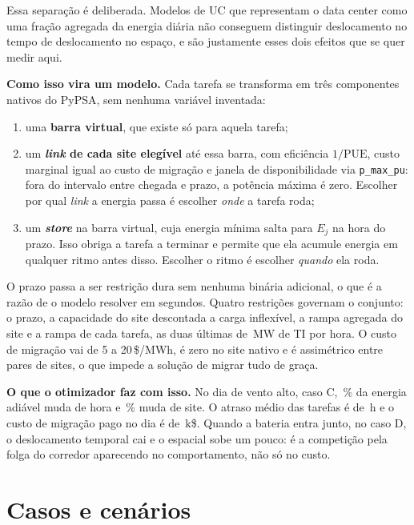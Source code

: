 \documentclass[11pt,a4paper]{article}
\begin{document}
Essa separação é deliberada. Modelos de UC que representam o data center como uma fração agregada da
energia diária não conseguem distinguir deslocamento no tempo de deslocamento no espaço, e são justamente
esses dois efeitos que se quer medir aqui.

\textbf{Como isso vira um modelo.} Cada tarefa se transforma em três componentes nativos do PyPSA, sem
nenhuma variável inventada:

\begin{enumerate}
\item uma \textbf{barra virtual}, que existe só para aquela tarefa;
\item um \textbf{\emph{link} de cada site elegível} até essa barra, com eficiência $1/\mathrm{PUE}$, custo
marginal igual ao custo de migração e janela de disponibilidade via \texttt{p\_max\_pu}: fora do intervalo
entre chegada e prazo, a potência máxima é zero. Escolher por qual \emph{link} a energia passa é escolher
\emph{onde} a tarefa roda;
\item um \textbf{\emph{store}} na barra virtual, cuja energia mínima salta para $E_j$ na hora do prazo.
Isso obriga a tarefa a terminar e permite que ela acumule energia em qualquer ritmo antes disso. Escolher
o ritmo é escolher \emph{quando} ela roda.
\end{enumerate}

O prazo passa a ser restrição dura sem nenhuma binária adicional, o que é a razão de o modelo resolver em
segundos. Quatro restrições governam o conjunto: o prazo, a capacidade do site descontada a carga
inflexível, a rampa agregada do site e a rampa de cada tarefa, as duas últimas de \numdcrampa{}\,MW de TI
por hora. O custo de migração vai de 5 a 20\,\$/MWh, é zero no site nativo e é assimétrico entre pares de
sites, o que impede a solução de migrar tudo de graça.

\textbf{O que o otimizador faz com isso.} No dia de vento alto, caso C, \numvdctemporal{}\,\% da energia
adiável muda de hora e \numvdcespacial{}\,\% muda de site. O atraso médio das tarefas é de
\numdcatraso{}\,h e o custo de migração pago no dia é de \numdcmigcusto{}\,k\$. Quando a bateria entra
junto, no caso D, o deslocamento temporal cai e o espacial sobe um pouco: é a competição pela folga do
corredor aparecendo no comportamento, não só no custo.

\section{Casos e cenários}
\end{document}
